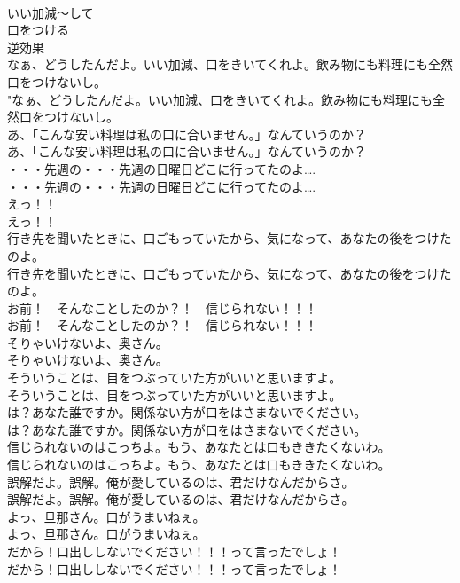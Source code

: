 \documentclass[8pt]{extreport}
\begin{document}
\begin{CJK}{UTF8}{min}
\\	いい加減〜して
\\	口をつける
\\	逆効果
\\	なぁ、どうしたんだよ。いい加減、口をきいてくれよ。飲み物にも料理にも全然口をつけないし。	
\\	"なぁ、どうしたんだよ。いい加減、口をきいてくれよ。飲み物にも料理にも全然口をつけないし。 
\\	あ、「こんな安い料理は私の口に合いません。」なんていうのか？	
\\	あ、「こんな安い料理は私の口に合いません。」なんていうのか？ 
\\	・・・先週の・・・先週の日曜日どこに行ってたのよ….	
\\	・・・先週の・・・先週の日曜日どこに行ってたのよ…. 
\\	えっ！！	
\\	えっ！！ 
\\	行き先を聞いたときに、口ごもっていたから、気になって、あなたの後をつけたのよ。	
\\	行き先を聞いたときに、口ごもっていたから、気になって、あなたの後をつけたのよ。 
\\	お前！　そんなことしたのか？！　信じられない！！！	
\\	お前！　そんなことしたのか？！　信じられない！！！ 
\\	そりゃいけないよ、奥さん。	
\\	そりゃいけないよ、奥さん。 
\\	そういうことは、目をつぶっていた方がいいと思いますよ。	
\\	そういうことは、目をつぶっていた方がいいと思いますよ。 
\\	は？あなた誰ですか。関係ない方が口をはさまないでください。	
\\	は？あなた誰ですか。関係ない方が口をはさまないでください。 
\\	信じられないのはこっちよ。もう、あなたとは口もききたくないわ。	
\\	信じられないのはこっちよ。もう、あなたとは口もききたくないわ。 
\\	誤解だよ。誤解。俺が愛しているのは、君だけなんだからさ。	
\\	誤解だよ。誤解。俺が愛しているのは、君だけなんだからさ。 
\\	よっ、旦那さん。口がうまいねぇ。	
\\	よっ、旦那さん。口がうまいねぇ。 
\\	だから！口出ししないでください！！！って言ったでしょ！	
\\	だから！口出ししないでください！！！って言ったでしょ！ 

\end{CJK}
\end{document}
